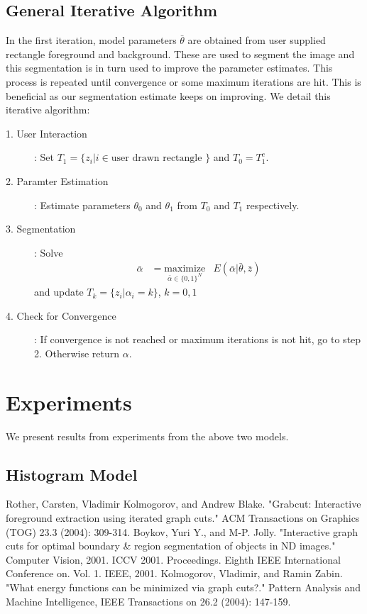 \documentclass[a4paper]{article}
\begin{document}
\subsection{General Iterative Algorithm}
In the first iteration, model parameters $\bar{\theta}$ are obtained from user supplied rectangle foreground and background. 
These are used to segment the image and this segmentation is in turn used to improve the parameter estimates. This process is repeated until convergence or some maximum iterations are hit.
This is beneficial as our segmentation estimate keeps on improving.
We detail this iterative algorithm:
\begin{description}
\item[1. User Interaction]:
Set $T_1 = \{z_i | i \in \text{user drawn rectangle }\}$ and $T_0 = T_1^c$. 

\item[2. Paramter Estimation]: Estimate parameters $\theta_0$ and $\theta_1$ from $T_0$ and $T_1$ respectively. 

\item[3. Segmentation]: Solve 
\begin{equation*}
\begin{aligned}
\bar{\alpha} &=  
 \underset{\bar{\alpha}\in\{0,1 \}^N}{\text{maximize}}
 & E(\bar{\alpha}| \bar{\theta},\bar{z} )
\end{aligned}
\end{equation*}
and update $T_k = \{z_i | \alpha_i = k\}$, $k = 0,1$

\item[4. Check for Convergence]: If convergence is not reached or maximum iterations is not hit,  
go to step 2. Otherwise return $\alpha$.
\end{description}

\section{Experiments}
We present results from experiments from the above two models.
\subsection{Histogram Model}




\begin{thebibliography}{10}

 Rother, Carsten, Vladimir Kolmogorov, and Andrew Blake. "Grabcut: Interactive foreground extraction using iterated graph cuts." ACM Transactions on Graphics (TOG) 23.3 (2004): 309-314.
 Boykov, Yuri Y., and M-P. Jolly. "Interactive graph cuts for optimal boundary \& region segmentation of objects in ND images." Computer Vision, 2001. ICCV 2001. Proceedings. Eighth IEEE International Conference on. Vol. 1. IEEE, 2001.
 Kolmogorov, Vladimir, and Ramin Zabin. "What energy functions can be minimized via graph cuts?." Pattern Analysis and Machine Intelligence, IEEE Transactions on 26.2 (2004): 147-159.
\end{thebibliography}
\end{document}
